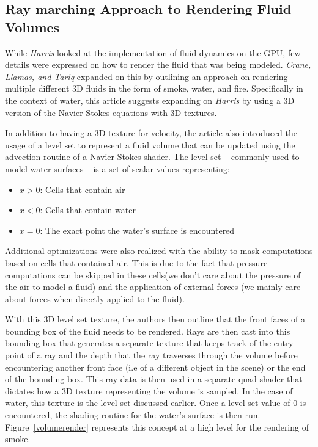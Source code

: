\documentclass[conference]{IEEEtran}
\begin{document}
\subsection{Ray marching Approach to Rendering Fluid Volumes}

While \textit{Harris} looked at the implementation of fluid dynamics on the GPU, few details were expressed on how to render the fluid that was being modeled. \textit{Crane, Llamas, and Tariq} expanded on this by outlining an approach on rendering multiple different 3D fluids in the form of smoke, water, and fire\cite{fluidrender}. Specifically in the context of water, this article suggests expanding on \textit{Harris} by using a 3D version of the Navier Stokes equations with 3D textures.

In addition to having a 3D texture for velocity, the article also introduced the usage of a level set to represent a fluid volume that can be updated using the advection routine of a Navier Stokes shader. The level set -- commonly used to model water surfaces -- is a set of scalar values representing:

\begin{itemize}
	\item $x > 0$: Cells that contain air

	\item $x < 0$: Cells that contain water

	\item $x = 0$: The exact point the water's surface is encountered

\end{itemize}

Additional optimizations were also realized with the ability to mask computations based on cells that contained air. This is due to the fact that pressure computations can be skipped in these cells(we don't care about the pressure of the air to model a fluid) and the application of external forces (we mainly care about forces when directly applied to the fluid).

With this 3D level set texture, the authors then outline that the front faces of a bounding box of the fluid needs to be rendered. Rays are then cast into this bounding box that generates a separate texture that keeps track of the entry point of a ray and the depth that the ray traverses through the volume before encountering another front face (i.e of a different object in the scene) or the end of the bounding box. This ray data is then used in a separate quad shader that dictates how a 3D texture representing the volume is sampled. In the case of water, this texture is the level set discussed earlier. Once a level set value of 0 is encountered, the shading routine for the water's surface is then run. Figure~\ref{volumerender} represents this concept at a high level for the rendering of smoke.
\end{document}
